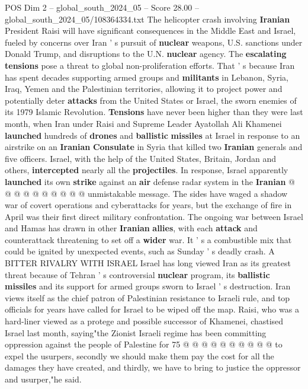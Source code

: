 \begin{textsample}{POS Dim 2 – global\_south\_2024\_05 – Score 28.00 – global\_south\_2024\_05/108364334.txt}  \label{ex:f2_pos_221}
The helicopter crash involving \textbf{Iranian} President Raisi will have significant consequences in the Middle East and Israel, fueled by concerns over Iran ' s pursuit of \textbf{nuclear} weapons, U.S. sanctions under Donald Trump, and disruptions to the U.N. \textbf{nuclear} agency.
The \textbf{escalating} \textbf{tensions} pose a threat to global non-proliferation efforts.
That ' s because Iran has spent decades supporting armed groups and \textbf{militants} in Lebanon, Syria, Iraq, Yemen and the Palestinian territories, allowing it to project power and potentially deter \textbf{attacks} from the United States or Israel, the sworn enemies of its 1979 Islamic Revolution. \textbf{Tensions} have never been higher than they were last month, when Iran under Raisi and Supreme Leader Ayatollah Ali Khamenei \textbf{launched} hundreds of \textbf{drones} and \textbf{ballistic} \textbf{missiles} at Israel in response to an airstrike on an \textbf{Iranian} \textbf{Consulate} in Syria that killed two \textbf{Iranian} generals and five officers.
Israel, with the help of the United States, Britain, Jordan and others, \textbf{intercepted} nearly all the \textbf{projectiles}.
In response, Israel apparently \textbf{launched} its own \textbf{strike} against an \textbf{air} defense radar system in the \textbf{Iranian} @ @ @ @ @ @ @ @ @ @ unmistakable message.
The sides have waged a shadow war of covert operations and cyberattacks for years, but the exchange of fire in April was their first direct military confrontation.
The ongoing war between Israel and Hamas has drawn in other \textbf{Iranian} \textbf{allies}, with each \textbf{attack} and counterattack threatening to set off a \textbf{wider} war.
It ' s a combustible mix that could be ignited by unexpected events, such as Sunday ' s deadly crash.
A BITTER RIVALRY WITH ISRAEL Israel has long viewed Iran as its greatest threat because of Tehran ' s controversial \textbf{nuclear} program, its \textbf{ballistic} \textbf{missiles} and its support for armed groups sworn to Israel ' s destruction.
Iran views itself as the chief patron of Palestinian resistance to Israeli rule, and top officials for years have called for Israel to be wiped off the map.
Raisi, who was a hard-liner viewed as a protege and possible successor of Khamenei, chastised Israel last month, saying"the Zionist Israeli regime has been committing oppression against the people of Palestine for 75 @ @ @ @ @ @ @ @ @ @ to expel the usurpers, secondly we should make them pay the cost for all the damages they have created, and thirdly, we have to bring to justice the oppressor and usurper,"he said.

\end{textsample}
